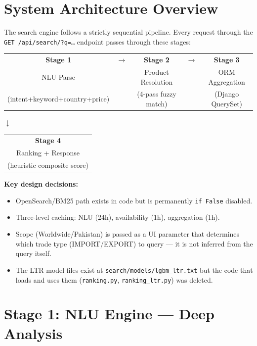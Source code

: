 \documentclass[12pt,a4paper]{article}
\begin{document}
\section{System Architecture Overview}

The search engine follows a strictly sequential pipeline. Every request through the
\texttt{GET /api/search/?q=\ldots} endpoint passes through these stages:

\begin{center}
\begin{tabular}{ccccc}
\textbf{Stage 1} & $\rightarrow$ & \textbf{Stage 2} & $\rightarrow$ & \textbf{Stage 3} \\
NLU Parse & & Product Resolution & & ORM Aggregation \\
\small(intent+keyword+country+price) & & \small(4-pass fuzzy match) & & \small(Django QuerySet) \\
\end{tabular}

\vspace{0.5em}
$\downarrow$

\begin{tabular}{c}
\textbf{Stage 4} \\
Ranking + Response \\
\small(heuristic composite score)
\end{tabular}
\end{center}

\vspace{1em}
\textbf{Key design decisions:}
\begin{itemize}
  \item OpenSearch/BM25 path exists in code but is permanently \texttt{if False} disabled.
  \item Three-level caching: NLU (24h), availability (1h), aggregation (1h).
  \item Scope (Worldwide/Pakistan) is passed as a UI parameter that determines which
        trade type (IMPORT/EXPORT) to query --- it is not inferred from the query itself.
  \item The LTR model files exist at \texttt{search/models/lgbm\_ltr.txt} but the code
        that loads and uses them (\texttt{ranking.py}, \texttt{ranking\_ltr.py}) was deleted.
\end{itemize}

\section{Stage 1: NLU Engine --- Deep Analysis}
\end{document}
